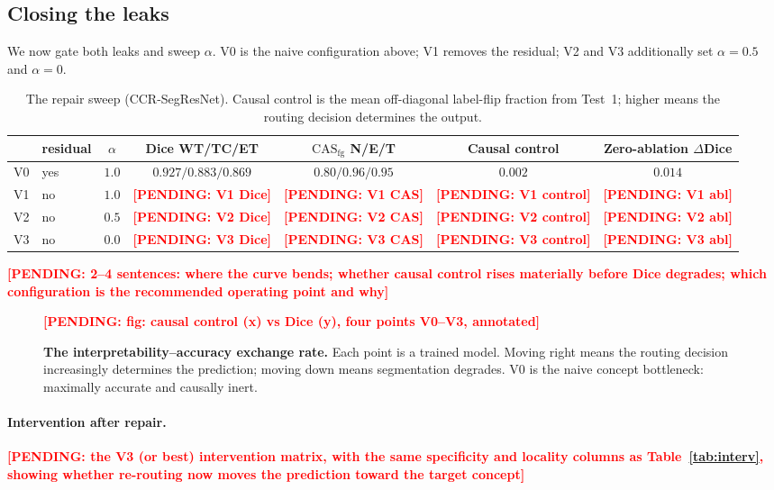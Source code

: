 \documentclass[runningheads]{llncs}
\newcommand{\casfg}{\mathrm{CAS}_{\mathrm{fg}}}
\newcounter{pend}
\newcommand{\pending}[1]{\stepcounter{pend}\textcolor{red}{\textbf{[PENDING: #1]}}}
\begin{document}
\subsection{Closing the leaks}\label{sec:repair}
We now gate both leaks and sweep $\alpha$. V0 is the naive configuration above; V1 removes the
residual; V2 and V3 additionally set $\alpha{=}0.5$ and $\alpha{=}0$.

\begin{table}[t]
\centering
\caption{The repair sweep (CCR-SegResNet). Causal control is the mean off-diagonal label-flip
fraction from Test~1; higher means the routing decision determines the output.}
\label{tab:sweep}
\begin{tabular}{llccccc}
\toprule
& residual & $\alpha$ & Dice WT/TC/ET & $\casfg$ N/E/T & Causal control & Zero-ablation $\Delta$Dice \\
\midrule
V0 & yes & $1.0$ & $0.927/0.883/0.869$ & $0.80/0.96/0.95$ & $0.002$ & $0.014$ \\
V1 & no  & $1.0$ & \pending{V1 Dice} & \pending{V1 CAS} & \pending{V1 control} & \pending{V1 abl} \\
V2 & no  & $0.5$ & \pending{V2 Dice} & \pending{V2 CAS} & \pending{V2 control} & \pending{V2 abl} \\
V3 & no  & $0.0$ & \pending{V3 Dice} & \pending{V3 CAS} & \pending{V3 control} & \pending{V3 abl} \\
\bottomrule
\end{tabular}
\end{table}

\pending{2--4 sentences: where the curve bends; whether causal control rises materially before
Dice degrades; which configuration is the recommended operating point and why}

\begin{figure}[t]
\centering
\pending{fig: causal control (x) vs Dice (y), four points V0--V3, annotated}
\caption{\textbf{The interpretability--accuracy exchange rate.} Each point is a trained model.
Moving right means the routing decision increasingly determines the prediction; moving down
means segmentation degrades. V0 is the naive concept bottleneck: maximally accurate and
causally inert.}
\label{fig:tradeoff}
\end{figure}

\paragraph{Intervention after repair.} \pending{the V3 (or best) intervention matrix, with the
same specificity and locality columns as Table~\ref{tab:interv}, showing whether re-routing now
moves the prediction toward the target concept}
\end{document}
